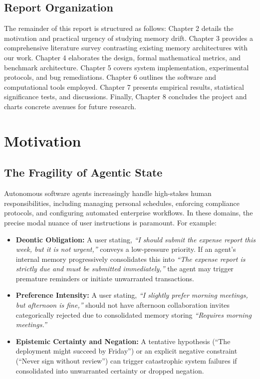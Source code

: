 \documentclass[12pt,a4paper]{report}
\begin{document}
\section{Report Organization}
The remainder of this report is structured as follows: Chapter 2 details the motivation and practical urgency of studying memory drift. Chapter 3 provides a comprehensive literature survey contrasting existing memory architectures with our work. Chapter 4 elaborates the design, formal mathematical metrics, and benchmark architecture. Chapter 5 covers system implementation, experimental protocols, and bug remediations. Chapter 6 outlines the software and computational tools employed. Chapter 7 presents empirical results, statistical significance tests, and discussions. Finally, Chapter 8 concludes the project and charts concrete avenues for future research.

\chapter{Motivation}

\section{The Fragility of Agentic State}
Autonomous software agents increasingly handle high-stakes human responsibilities, including managing personal schedules, enforcing compliance protocols, and configuring automated enterprise workflows. In these domains, the precise modal nuance of user instructions is paramount. For example:
\begin{itemize}
    \item \textbf{Deontic Obligation:} A user stating, \textit{``I should submit the expense report this week, but it is not urgent,''} conveys a low-pressure priority. If an agent's internal memory progressively consolidates this into \textit{``The expense report is strictly due and must be submitted immediately,''} the agent may trigger premature reminders or initiate unwarranted transactions.
    \item \textbf{Preference Intensity:} A user stating, \textit{``I slightly prefer morning meetings, but afternoon is fine,''} should not have afternoon collaboration invites categorically rejected due to consolidated memory storing \textit{``Requires morning meetings.''}
    \item \textbf{Epistemic Certainty and Negation:} A tentative hypothesis (``The deployment might succeed by Friday'') or an explicit negative constraint (``Never sign without review'') can trigger catastrophic system failures if consolidated into unwarranted certainty or dropped negation.
\end{itemize}
\end{document}
